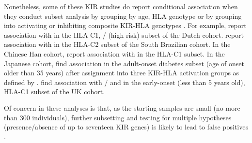 Nonetheless, some of these KIR studies do report conditional association when they conduct subset analysis by grouping by age,
HLA genotype or by grouping into activating or inhibiting composite KIR-HLA genotypes \citep{Carrington:2005ee,vanderSlik:2007hi}.
For example, \cite{vanderSlik:2003gq} report association with  in the HLA-C1, / (high risk) subset of the Dutch cohort.
\citet{Jobim:2010} report association with  in the HLA-C2 subset of the South Brazilian cohort.
In the Chinese Han cohort, \citet{Zhi:2011kl} report association with  in the HLA-C1 subset.
In the Japanese cohort, \citet{Mogami:2007gj} find association in the adult-onset diabetes subset (age of onset older than 35 years)
after assignment into three KIR-HLA activation groups as defined by \citet{Carrington:2005ee}.
\citet{Mehers:2011fj} find association with / and  in the early-onset (less than 5 years old), HLA-C1 subset of the UK cohort.


Of concern in these analyses is that, as the starting samples are small (no more than 300 individuals),
further subsetting and testing for multiple hypotheses (presence/absence of up to seventeen KIR genes)
is likely to lead to false positives \citep{Wittes:2009bc}.


